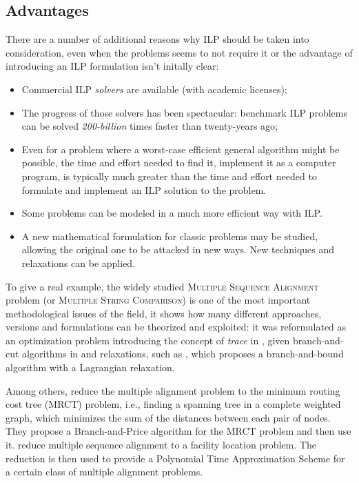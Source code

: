 \clearpage
\subsection{Advantages}

There are a number of additional reasons why ILP should be taken into consideration, even when the problems seems to not require it or the advantage of introducing an ILP formulation isn't initally clear\cite{gusfieldilp}:

\begin{itemize}
	\item Commercial ILP \textit{solvers} are available (with academic licenses);
	\item The progress of those solvers has been spectacular: benchmark ILP problems can be solved \textit{200-billion} times faster than twenty-years ago;
	\item Even for a problem where a worst-case efficient general algorithm might be possible, the time and effort needed to find it, implement it as a computer program, is typically much greater than the time and effort needed to formulate and implement an ILP solution to the problem.
	\item Some problems can be modeled in a much more efficient way with ILP.
	\item A new mathematical formulation for classic problems may be studied, allowing the original one to be attacked in new ways. New techniques and relaxations can be applied.
\end{itemize}

To give a real example, the widely studied \textsc{Multiple Sequence Alignment} problem \cite{carrillo1988multiple} (or \textsc{Multiple String Comparison}) is one of the most important methodological issues of the field, it shows how many different approaches, versions and formulations can be theorized and exploited: it was reformulated as an optimization problem introducing the concept of \textit{trace} in \cite{Kececioglu1993}, given branch-and-cut algorithms in \cite{KECECIOGLU2000143} and relaxations, such as \cite{Althaus2007}, which proposes a branch-and-bound algorithm with a Lagrangian relaxation. 

Among others, \cite{NET:NET10022} reduce the multiple alignment problem to the minimum routing cost tree (MRCT) problem, i.e., finding a spanning tree in a complete weighted graph, which minimizes the sum of the distances between each pair of nodes. They propose a Branch-and-Price algorithm for the MRCT problem and then use it. \cite{DBLP:conf/stringology/JustV00} reduce multiple sequence alignment to a facility location problem. The reduction is then used to provide a Polynomial Time Approximation Scheme for a certain class of multiple alignment problems.


